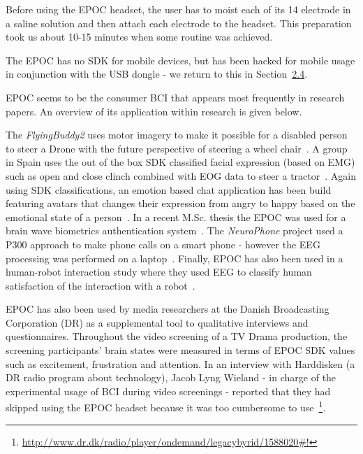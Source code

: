 \documentclass[a4paper,10pt,english,lof,lot,twoside]{puthesis}
\begin{document}
Before using the EPOC headset, the user has to moist each of its 14 electrode in
a saline solution and then attach each electrode to the headset. This
preparation took us about 10-15 minutes when some routine was achieved.

The EPOC has no SDK for mobile devices, but has been hacked for mobile usage in
conjunction with the USB dongle - we return to this in Section {\hyperref[ch-background/index:sec-related-works]{2.4}}.

EPOC seems to be the consumer BCI that appears most frequently in research
papers. An overview of its application within research is given below.

The \emph{FlyingBuddy2} uses motor imagery to make it possible for a disabled person
to steer a Drone with the future perspective of steering a wheel chair \cite{yu_flyingbuddy2:_2012}. A group in Spain uses the out of the box SDK
classified facial expression (based on EMG) such as open and close clinch
combined with EOG data to steer a tractor \cite{gomez-gil_steering_2011}. Again using SDK classifications, an emotion
based chat application has been build featuring avatars that changes their
expression from angry to happy based on the emotional state of a person \cite{wright_emochat_2010}. In a recent M.Sc. thesis the EPOC was used for a
brain wave biometrics authentication system \cite{petersen_development_2012}. The \emph{NeuroPhone} project used a P300
approach to make phone calls on a smart phone - however the EEG processing was
performed on a laptop \cite{campbell_neurophone:_2010}. Finally, EPOC
has also been used in a human-robot interaction study where they used EEG to
classify human satisfaction of the interaction with a robot \cite{esfahani_using_2011}.

EPOC has also been used by media researchers at the Danish
Broadcasting Corporation (DR) as a supplemental tool to qualitative interviews
and questionnaires. Throughout the video screening of a TV Drama production,
the screening participants' brain states were measured in terms of EPOC SDK
values such as excitement, frustration and attention. In an
interview with Harddisken (a DR radio program about technology), Jacob Lyng
Wieland - in charge of the experimental usage of BCI during video screenings -
reported that they had skipped using the EPOC headset because it was too
cumbersome to use \footnote{
\href{http://www.dr.dk/radio/player/ondemand/legacybyrid/1588020\#!}{http://www.dr.dk/radio/player/ondemand/legacybyrid/1588020\#!}
}.
\end{document}

